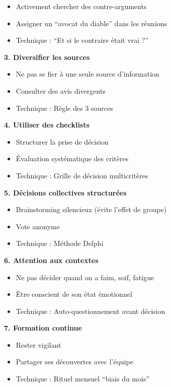 \documentclass[
]{article}
\providecommand{\tightlist}{%
  \setlength{\itemsep}{0pt}\setlength{\parskip}{0pt}}
\begin{document}
\begin{itemize}
\tightlist
\item
  Activement chercher des contre-arguments
\item
  Assigner un ``avocat du diable'' dans les réunions
\item
  Technique : ``Et si le contraire était vrai ?''
\end{itemize}

\textbf{3. Diversifier les sources}

\begin{itemize}
\tightlist
\item
  Ne pas se fier à une seule source d'information
\item
  Consulter des avis divergents
\item
  Technique : Règle des 3 sources
\end{itemize}

\textbf{4. Utiliser des checklists}

\begin{itemize}
\tightlist
\item
  Structurer la prise de décision
\item
  Évaluation systématique des critères
\item
  Technique : Grille de décision multicritères
\end{itemize}

\textbf{5. Décisions collectives structurées}

\begin{itemize}
\tightlist
\item
  Brainstorming silencieux (évite l'effet de groupe)
\item
  Vote anonyme
\item
  Technique : Méthode Delphi
\end{itemize}

\textbf{6. Attention aux contextes}

\begin{itemize}
\tightlist
\item
  Ne pas décider quand on a faim, soif, fatigue
\item
  Être conscient de son état émotionnel
\item
  Technique : Auto-questionnement avant décision
\end{itemize}

\textbf{7. Formation continue}

\begin{itemize}
\tightlist
\item
  Rester vigilant
\item
  Partager ses découvertes avec l'équipe
\item
  Technique : Rituel mensuel ``biais du mois''
\end{itemize}
\end{document}

